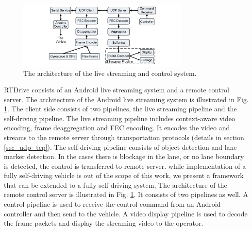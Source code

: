 


\begin{figure}[t]
\centering
  \includegraphics[width=3.4in,angle=0]{Figs/RTDrive/architecture.pdf}
\caption{The architecture of the live streaming and control system.}
\vspace{-0.5cm}
\label{server}
\end{figure}

RTDrive consists of an Android live streaming system and 
a remote control server. 
The architecture of the Android live streaming system is illustrated
in Fig. \ref{server}. 
The client side consists of two pipelines, the live streaming pipeline and the self-driving
pipeline. 
The live streaming pipeline includes context-aware video encoding, frame
deaggregation and FEC encoding.  
It encodes the video and streams to the remote server through transportation
protocols (details in section \ref{sec_udp_tcp}). 
The self-driving pipeline consists of object detection and lane marker detection. 
In the cases there is blockage in the lane, or no lane boundary is detected,
the control is transferred to remote server. 
while implementation of a fully self-driving vehicle
is out of the scope of this work, 
we present a framework that can be extended to a fully self-driving system, 
The architecture of the remote control server is illustrated in Fig. \ref{server}. 
It consists of two pipelines as well. 
A control pipeline is used to receive the control command from
an Android controller and then send to the vehicle. 
A video display pipeline is used to decode the frame packets
and display the streaming video to the operator. 



